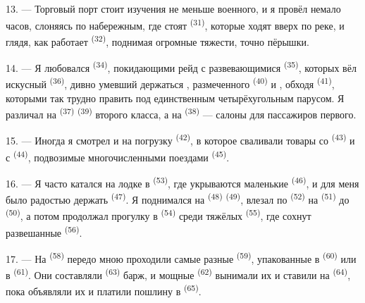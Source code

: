 13. --- Торговый порт стоит изучения не меньше военного, и я провёл
немало часов, слоняясь по набережным, где стоят 
\textsuperscript{(31)}, которые ходят вверх по реке, и глядя, как работает
 \textsuperscript{(32)}, поднимая огромные тяжести, точно
пёрышки.

\VUsaut{4.0mm}
\VUsaut{3.0mm}

14. --- Я любовался 
\textsuperscript{(34)}, покидающими рейд с развевающимися 
\textsuperscript{(35)}, которых вёл искусный  \textsuperscript{(36)},
дивно умевший держаться , размеченного 
\textsuperscript{(40)} и , обходя 
\textsuperscript{(41)}, которыми так трудно править под единственным
четырёхугольным парусом. Я различал на  \textsuperscript{(37)}
 \textsuperscript{(39)} второго класса, а на 
\textsuperscript{(38)} --- салоны для пассажиров первого.

15. --- Иногда я смотрел и на погрузку 
\textsuperscript{(42)}, в которое сваливали товары со 
\textsuperscript{(43)} и с  \textsuperscript{(44)},
подвозимые многочисленными поездами 
\textsuperscript{(45)}.

\VUsaut{3.0mm}
\VUsaut{3.0mm}

16. --- Я часто катался на лодке в  \textsuperscript{(53)},
где укрываются маленькие  \textsuperscript{(46)}, и для меня было
радостью держать  \textsuperscript{(47)}. Я поднимался на
 \textsuperscript{(48)}  \textsuperscript{(49)},
влезал по  \textsuperscript{(52)} на 
\textsuperscript{(51)} до  \textsuperscript{(50)}, а потом продолжал
прогулку в  \textsuperscript{(54)} среди тяжёлых  \textsuperscript{(55)}, где сохнут развешанные 
\textsuperscript{(56)}.

17. --- На  \textsuperscript{(58)} передо мною проходили самые
разные  \textsuperscript{(59)}, упакованные в 
\textsuperscript{(60)} или в  \textsuperscript{(61)}. Они составляли
 \textsuperscript{(63)} барж, и мощные 
\textsuperscript{(62)} вынимали их и ставили на 
\textsuperscript{(64)}, пока  объявляли их и платили пошлину
в  \textsuperscript{(65)}.

